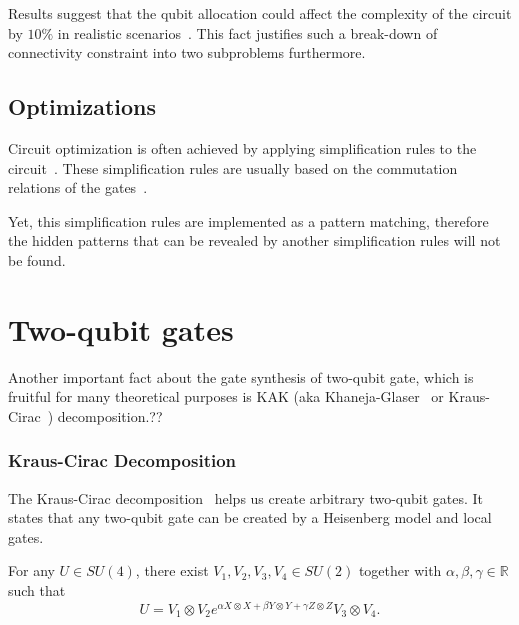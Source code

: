
Results suggest that the qubit allocation could affect the complexity of the circuit by $10\%$ in realistic scenarios~\cite{paler2019}. This fact justifies such a break-down of connectivity constraint into two subproblems furthermore.

\subsection{Optimizations}


Circuit optimization is often achieved by applying simplification rules to the circuit~\cite{pointing2021}. These simplification rules are usually based on the commutation relations of the gates~\cite{itoko2019}.

Yet, this simplification rules are implemented as a pattern matching, therefore the hidden patterns that can be revealed by another simplification rules will not be found.

\section{Two-qubit gates}



Another important fact about the gate synthesis of two-qubit gate, which is fruitful for many theoretical purposes is KAK (aka Khaneja-Glaser~\cite{khaneja2001} or Kraus-Cirac~\cite{kraus2001}) decomposition.??



\subsubsection{Kraus-Cirac Decomposition}

The Kraus-Cirac decomposition~\cite{kraus2001} helps us create arbitrary two-qubit gates. It states that any two-qubit gate can be created by a Heisenberg model and local gates.

\begin{theorem}
For any $U \in SU(4)$, there exist $V_1, V_2, V_3, V_4 \in SU(2)$ together with $\alpha, \beta, \gamma \in \mathbb{R}$ such that
\begin{equation}
  U = V_1 \otimes V_2 e^{\alpha X\otimes X + \beta Y\otimes Y + \gamma Z\otimes Z} V_3 \otimes V_4.
  \end{equation}
\end{theorem}

